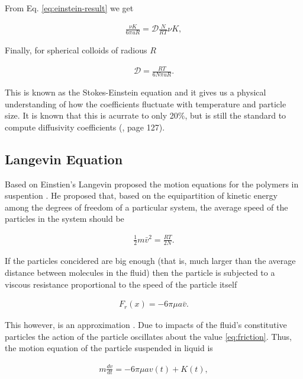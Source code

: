 From Eq. \ref{eq:einstein-result} we get

\begin{align}
\frac{\nu K}{6\pi u R} = \mathcal{D}\frac{N}{RT}\nu K,
\end{align}

Finally, for spherical colloids of radious $R$

\begin{align}
	\mathcal{D} = \frac{RT}{6N\pi u R}.
\end{align}


This is known as the Stokes-Einstein equation and it gives us a physical understanding of how the coefficients fluctuate with temperature and particle size. It is known that this is acurrate to only 20\%, but is still the standard to compute diffusivity coefficients (\cite{cussler}, page 127).









\subsection{Langevin Equation}

Based on Einstien's \cite{einstein} Langevin proposed the motion equations for the polymers in suspention \cite{langevin_translation}. He proposed that, based on the equipartition of kinetic energy among the degrees of freedom of a particular system, the average speed of the particles in the system should be

\begin{align}
	\frac{1}{2}m\bar{v}^2 = \frac{RT}{2N}.
\end{align}

If the particles concidered are big enough (that is, much larger than the average distance between molecules in the fluid) then the particle is subjected to a viscous resistance proportional to the speed of the particle itself

\begin{align}
	\label{eq:friction}
	F_r(x) = -6\pi\mu a \bar{v}.
\end{align}

This however, is an approximation \cite{langevin_original}. Due to impacts of the fluid's constitutive particles the action of the particle oscillates about the value \ref{eq:friction}. Thus, the motion equation of the particle suspended in liquid is

\begin{align}
\label{eq:langevin}
	m\frac{d v}{dt} = -6\pi\mu a v(t) + K(t),
\end{align}

